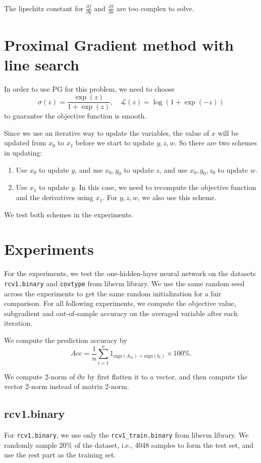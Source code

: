 \documentclass{article}
\numberwithin{equation}{section}
\numberwithin{figure}{section}
\begin{document}
The lipschitz constant for $\frac{\partial f}{\partial y}$ and $\frac{\partial f}{\partial x}$ are too complex to solve. 

\section{Proximal Gradient method with line search}
In order to use PG for this problem, we need to choose 
\begin{equation}
\sigma(z) = \frac{\exp(z)}{1+\exp(z)}, \quad \mathcal{L}(z) = \log(1+\exp(-z))
\end{equation}
to guarantee the objective function is smooth.

Since we use an iterative way to update the variables, the value of $x$ will be updated from $x_0 $ to $x_1 $ before we start to update $y, z, w$. So there are two schemes in updating:
\begin{enumerate}
\item Use $x_0 $ to update $y$, and use $x_0, y_0 $ to update $z$, and use $x_0, y_0, z_0 $ to update $w$.
\item Use $x_1 $ to update $y$. In this case, we need to recompute the objective function and the derivatives using $ x_1 $. For $y, z, w$, we also use this scheme.
\end{enumerate}
We test both schemes in the experiments.

\section{Experiments}
For the experiments, we test the one-hidden-layer neural network on the datasets \texttt{rcv1.binary} and \texttt{covtype} from libsvm library. We use the same random seed across the experiments to get the same random initialization for a fair comparison. For all following experiments, we compute the objective value, subgradient and out-of-sample accuracy on the averaged variable after each iteration.

We compute the prediction accuracy by
\begin{equation}
Acc = \frac{1}{n}\sum_{i=1}^{n} 1_{\text{sign}(A_{2i}) = \text{sign}(b_i)} \times 100\%.
\end{equation}

We compute 2-norm of $\partial x$ by first flatten it to a vector, and then compute the vector 2-norm instead of matrix 2-norm. 

\subsection{rcv1.binary}
For \texttt{rcv1.binary}, we use only the \texttt{rcv1\_train.binary} from libsvm library. We randomly sample $20\%$ of the dataset, i.e., 4048 samples to form the test set, and use the rest part as the training set. 
\end{document}
